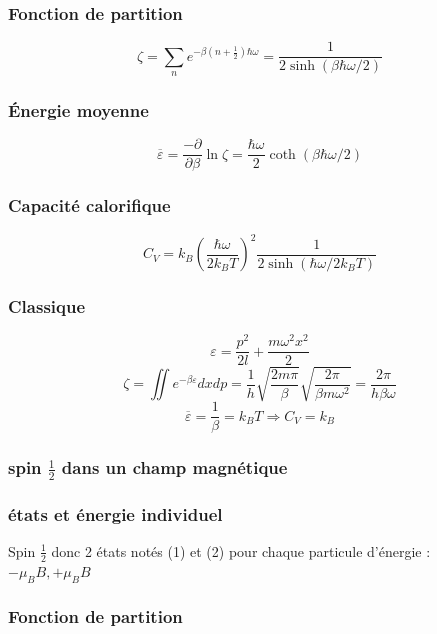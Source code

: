 \documentclass[12pt,a4paper]{report}
\begin{document}
\subsubsection{Fonction de partition}

\[
	\zeta = \sum_n e^{-\beta \left ( n + \frac{1}{2}\right ) \hbar \omega} = \dfrac{1}{2\sinh\left ( \beta \hbar \omega/2\right )}
\]

\subsubsection{Énergie moyenne}
\[
	\overline{\varepsilon} = \dfrac{-\partial}{\partial \beta} \ln \zeta = \dfrac{\hbar \omega}{2} \coth \left (\beta \hbar \omega / 2 \right )
\]

\subsubsection{Capacité calorifique}

\[
	C_V = k_B \left ( \dfrac{\hbar \omega}{2 k_B T} \right )^2 \dfrac{1}{2\sinh\left ( \hbar \omega/2 k_B T\right )}
\]

\subsubsection{Classique}

\[
	\varepsilon = \dfrac{p^2}{2l} + \dfrac{m \omega^2 x^2}{2}
\]
\[
	\zeta = \iint e^{-\beta \varepsilon} dx dp = \dfrac{1}{h} \sqrt{\dfrac{2m\pi}{\beta}} \sqrt{\dfrac{2\pi}{\beta m \omega^2}} = \dfrac{2\pi}{h \beta \omega}
\]
\[
	\overline{\varepsilon} = \dfrac{1}{\beta} = k_B T \Rightarrow C_V = k_B
\]

\subsubsection{spin \(\frac{1}{2}\) dans un champ magnétique}

\subsubsection{états et énergie individuel}

Spin \(\frac{1}{2}\) donc 2 états notés (1) et (2) pour chaque particule d'énergie : \(-\mu_B B, + \mu_B B\)

\subsubsection{Fonction de partition}
\end{document}
